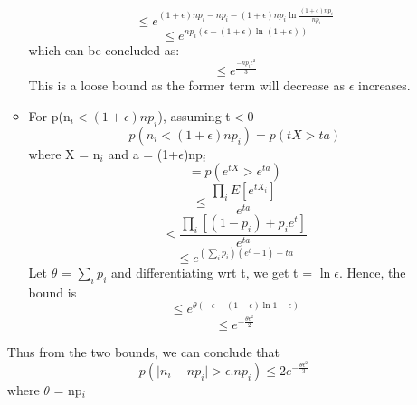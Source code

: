 \documentclass[12pt,a4paper]{article}
\begin{document}
\begin{enumerate}[label=\alph*]
\begin{itemize}
\begin{equation*}
        \end{equation*}
        \begin{equation*}
            \leqslant e^{(1+\epsilon)np_{i} - np_{i} - (1+\epsilon)np_{i}\ln{\frac{(1+\epsilon)np_{i}}{np_{i}}}}
        \end{equation*}
        \begin{equation*}
            \leqslant e^{np_{i}(\epsilon - (1+\epsilon)\ln{{(1+\epsilon)}})}
        \end{equation*}
        which can be concluded as:
        \begin{equation*}
            \leqslant e^{\frac{-np_{i}\epsilon^{2}}{3}}
        \end{equation*}
        This is a loose bound as the former term will decrease as $\epsilon$ increases.
        \item For p(n$_{i} < (1+\epsilon) np_{i}$), assuming t$<$0
        \begin{equation*}
            p(n_{i} < (1+\epsilon) np_{i}) = p(tX > ta)  
        \end{equation*}
        where X = n$_{i}$ and a = (1+$\epsilon$)np$_{i}$
        \begin{equation*}
            = p(e^{tX} > e^{ta})
        \end{equation*}
        \begin{equation*}
            \leqslant \frac{\prod_{i}E[e^{tX_{i}}]}{e^{ta}}
        \end{equation*}
        \begin{equation*}
            \leqslant \frac{\prod_{i}[(1-p_{i}) + p_{i}e^{t}]}{e^{ta}}
        \end{equation*}
        \begin{equation*}
            \leqslant e^{(\sum_{i}p_{i})(e^{t} - 1) - ta}
        \end{equation*}
        Let $\theta$ = $\sum_{i}p_{i}$ and differentiating wrt t,
        we get t = $\ln{\epsilon}$.
        Hence, the bound is
        \begin{equation*}
            \leqslant e^{\theta(-\epsilon - (1-\epsilon)\ln{1-\epsilon})}
        \end{equation*}
        \begin{equation*}
            \leqslant e^{-\frac{\theta \epsilon^{2}}{2}}
        \end{equation*}
    \end{itemize}
    Thus from the two bounds, we can conclude that 
    \begin{equation*}
        p( \lvert n_{i} - np_{i} \rvert > \epsilon.np_{i}) \leqslant 2e^{-\frac{\theta\epsilon^{2}}{3}}
    \end{equation*}
    where $\theta$ = np$_{i}$
\end{enumerate}
\end{document}
